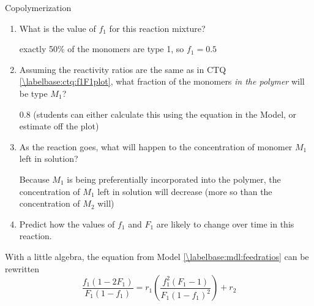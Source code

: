 \begin{activity}{Copolymerization}
\begin{ctqs}
		\begin{enumerate}
			\item What is the value of $f_1$ for this reaction mixture?
			
				\begin{solution}[0.5in]
					exactly 50\% of the monomers are type 1, so $f_1=0.5$
				\end{solution}
			
			\item Assuming the reactivity ratios are the same as in CTQ \ref{\labelbase:ctq:f1F1plot}, what fraction of the monomers \emph{in the polymer} will be type $M_1$?
			
				\begin{solution}[0.5in]
					0.8 (students can either calculate this using the equation in the Model, or estimate off the plot)
				\end{solution}
			
			\item As the reaction goes, what will happen to the concentration of monomer $M_1$ left in solution?
				
				\begin{solution}[1in]
					Because $M_1$ is being preferentially incorporated into the polymer, the concentration of $M_1$ left in solution will decrease (more so than the concentration of $M_2$ will)
				\end{solution}
			\item Predict how the values of $f_1$ and $F_1$ are likely to change over time in this reaction.
				
				\begin{solution}[1in]\end{solution}
			
			
		\end{enumerate}
		
	\question \label{\labelbase:ctq:FinemanRoss} With a little algebra, the equation from Model \ref{\labelbase:mdl:feedratios} can be rewritten
		\begin{equation*}
			\frac{f_1(1-2F_1)}{F_1(1-f_1)} = r_1\left(\frac{f_1^2(F_1-1)}{F_1(1-f_1)^2}\right)+r_2
		\end{equation*}
		

\end{ctqs}
\end{activity}
